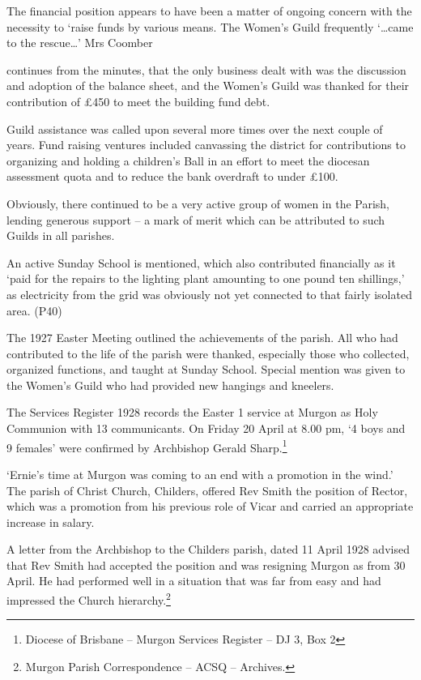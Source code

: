 The financial position appears to have been a matter of ongoing concern
with the necessity to `raise funds by various means. The Women's Guild
frequently `\ldots came to the rescue\ldots' Mrs Coomber

continues from the minutes, that the only business dealt with was the
discussion and adoption of the balance sheet, and the Women's Guild was
thanked for their contribution of \pounds450 to meet the building fund debt.

Guild assistance was called upon several more times over the next couple
of years. Fund raising ventures included canvassing the district for
contributions to organizing and holding a children's Ball in an effort
to meet the diocesan assessment quota and to reduce the bank overdraft
to under \pounds100.

Obviously, there continued to be a very active group of women in the
Parish, lending generous support -- a mark of merit which can be
attributed to such Guilds in all parishes.

An active Sunday School is mentioned, which also contributed financially
as it `paid for the repairs to the lighting plant amounting to one pound
ten shillings,' as electricity from the grid was obviously not yet
connected to that fairly isolated area. (P40)

The 1927 Easter Meeting outlined the achievements of the parish. All who
had contributed to the life of the parish were thanked, especially those
who collected, organized functions, and taught at Sunday School. Special
mention was given to the Women's Guild who had provided new hangings and
kneelers.

The Services Register 1928 records the Easter 1 service at Murgon as
Holy Communion with 13 communicants. On Friday 20 April at 8.00 pm, `4
boys and 9 females' were confirmed by Archbishop Gerald
Sharp.\footnote{Diocese of Brisbane -- Murgon Services Register -- DJ 3,
  Box 2}

`Ernie's time at Murgon was coming to an end with a promotion in the
wind.' The parish of Christ Church, Childers, offered Rev Smith the
position of Rector, which was a promotion from his previous role of
Vicar and carried an appropriate increase in salary.

A letter from the Archbishop to the Childers parish, dated 11 April 1928
advised that Rev Smith had accepted the position and was resigning
Murgon as from 30 April. He had performed well in a situation that was
far from easy and had impressed the Church hierarchy.\footnote{Murgon
  Parish Correspondence -- ACSQ -- Archives.}

